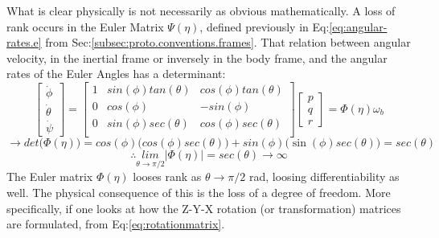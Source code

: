 \par
What is clear physically is not necessarily as obvious mathematically. A loss of rank occurs in the Euler Matrix $\Psi(\eta)$, defined previously in Eq:\ref{eq:angular-rates.e} from Sec:\ref{subsec:proto.conventions.frames}. That relation between angular velocity, in the inertial frame or inversely in the body frame, and the angular rates of the Euler Angles has a determinant:
\begin{equation}\label{eq:euler-derivative}
\begin{bmatrix}
\dot{\phi}\\
\dot{\theta}\\
\dot{\psi}
\end{bmatrix}
=\begin{bmatrix}
1 & sin(\phi)tan(\theta) & cos(\phi)tan(\theta)\\
0 & cos(\phi) & -sin(\phi)\\
0 & sin(\phi)sec(\theta) & cos(\phi)sec(\theta)\\
\end{bmatrix}
\begin{bmatrix}
p\\
q\\
r
\end{bmatrix}
=\Phi(\eta)\omega_b
\end{equation}
\vspace{-2pt}
\begin{equation}
\rightarrow det\big(\Phi(\eta)\big)=cos(\phi)\big(cos(\phi)sec(\theta)\big)+sin(\phi)\big(\sin(\phi)sec(\theta)\big)=sec(\theta)
\end{equation}
\vspace{-6pt}
\begin{equation}
\therefore \underset{{\theta \rightarrow \pi /2}}{lim}|\Phi(\eta)|=sec(\theta)\rightarrow \infty
\end{equation}
The Euler matrix $\Phi(\eta)$ looses rank as $\theta\rightarrow\pi/2$ rad, loosing differentiability as well. The physical consequence of this is the loss of a degree of freedom. More specifically, if one looks at how the Z-Y-X rotation (or transformation) matrices are formulated, from Eq:\ref{eq:rotationmatrix}.

